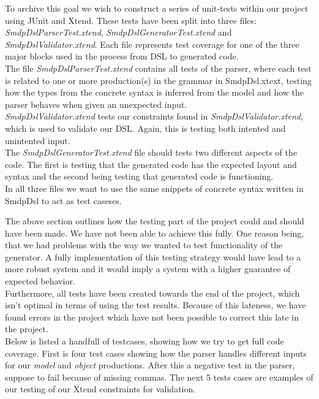 \documentclass[paper=a4, fontsize=11pt]{scrartcl} %
\numberwithin{equation}{section} %
\numberwithin{figure}{section} %
\numberwithin{table}{section} %
\begin{document}
To archive this goal we wish to construct a series of unit-tests within our project using JUnit and Xtend. These tests have been split into three files: \textit{SmdpDslParserTest.xtend}, \textit{SmdpDslGeneratorTest.xtend} and \textit{SmdpDslValidator.xtend}. Each file represents test coverage for one of the three major blocks used in the process from DSL to generated code.\\
The file \textit{SmdpDslParserTest.xtend} contains all tests of the parser, where each test is related to one or more production(s) in the grammar in SmdpDsl.xtext, testing how the types from the concrete syntax is inferred from the model and how the parser behaves when given an unexpected input.\\ 
\textit{SmdpDslValidator.xtend} tests our constraints found in \textit{SmdpDslValidator.xtend}, which is used to validate our DSL. Again, this is testing both intented and unintented input.\\ 
The \textit{SmdpDslGeneratorTest.xtend} file should tests two different aspects of the code. The first is testing that the generated code has the expected layout and syntax and the second being testing that generated code is functioning. \\
In all three files we want to use the same snippets of concrete syntax written in SmdpDsl to act as test caseses.\newline

The above section outlines how the testing part of the project could and should have been made. We have not been able to achieve this fully. One reason being, that we had problems with the way we wanted to test functionality of the generator. A fully implementation of this testing strategy would have lead to a more robust system and it would imply a system with a higher guarantee of expected behavior. \\
Furthermore, all tests have been created towards the end of the project, which isn't optimal in terms of using the test results. Because of this lateness, we have found errors in the project which have not been possible to correct this late in the project.\\

Below is listed a handfull of testcases, showing how we try to get full code coverage. First is four test cases showing how the parser handles different inputs for our \textit{model} and \textit{object} productions. After this a negative test in the parser, suppose to fail because of missing commas. The next 5 tests cases are examples of our testing of our Xtend constraints for validation.  
\end{document}
